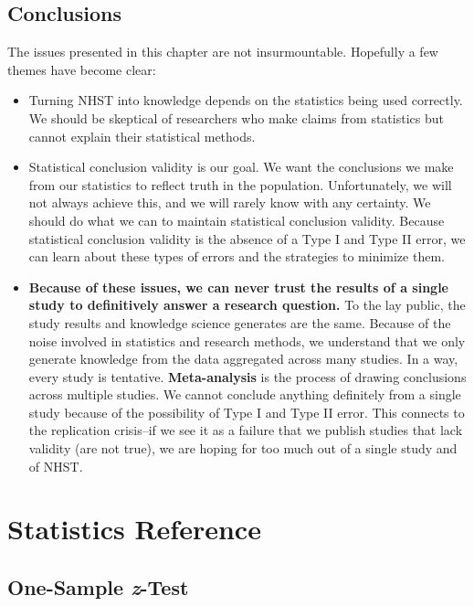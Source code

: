 \documentclass[
]{book}
\begin{document}
\hypertarget{conclusions}{%
\section{Conclusions}\label{conclusions}}

The issues presented in this chapter are not insurmountable. Hopefully a few themes have become clear:

\begin{itemize}
\item
  Turning NHST into knowledge depends on the statistics being used correctly. We should be skeptical of researchers who make claims from statistics but cannot explain their statistical methods.
\item
  Statistical conclusion validity is our goal. We want the conclusions we make from our statistics to reflect truth in the population. Unfortunately, we will not always achieve this, and we will rarely know with any certainty. We should do what we can to maintain statistical conclusion validity. Because statistical conclusion validity is the absence of a Type I and Type II error, we can learn about these types of errors and the strategies to minimize them.
\item
  \textbf{Because of these issues, we can never trust the results of a single study to definitively answer a research question.} To the lay public, the study results and knowledge science generates are the same. Because of the noise involved in statistics and research methods, we understand that we only generate knowledge from the data aggregated across many studies. In a way, every study is tentative. \textbf{Meta-analysis} is the process of drawing conclusions across multiple studies. We cannot conclude anything definitely from a single study because of the possibility of Type I and Type II error. This connects to the replication crisis--if we see it as a failure that we publish studies that lack validity (are not true), we are hoping for too much out of a single study and of NHST.
\end{itemize}

\hypertarget{statistics-reference}{%
\chapter{Statistics Reference}\label{statistics-reference}}

\hypertarget{one-sample-z-test}{%
\section{\texorpdfstring{One-Sample \emph{z}-Test}{One-Sample z-Test}}\label{one-sample-z-test}}
\end{document}
